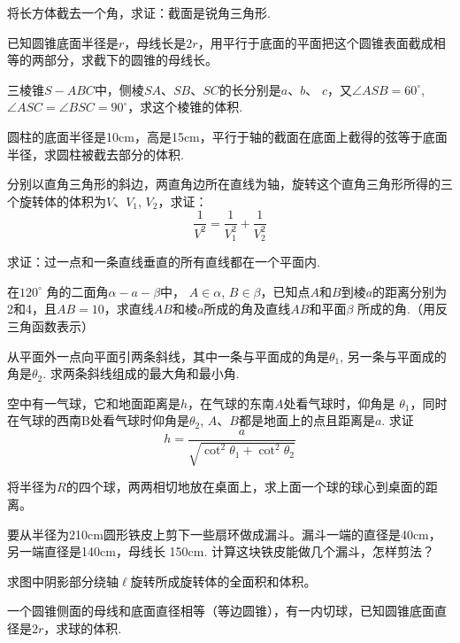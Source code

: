 \begin{enumerate}
 \item 将长方体截去一个角，求证：截面是锐角三角形.
 \item 
已知圆锥底面半径是$r$，母线长是$2r$，用平行于底面的平面把这个圆锥表面截成相等的两部分，求截下的圆锥的母线长。

 \item 三棱锥$S-ABC$中，侧棱$SA$、$SB$、$SC$的长分别是$a$、$b$、 $c$，又$\angle ASB=60^{\circ}$,  $\angle ASC=\angle BSC=90^{\circ}$，求这个棱锥的体积.

 \item 圆柱的底面半径是10cm，高是15cm，平行于轴的截面在底面上截得的弦等于底面半径，求圆柱被截去部分的体积.

 \item 分别以直角三角形的斜边，两直角边所在直线为轴，旋转这个直角三角形所得的三个旋转体的体积为$V$、$V_{1}$, $V_{2}$，求证：
\[
\frac{1}{V^{2}}=\frac{1}{V_{1}^{2}}+\frac{1}{V_{2}^{2}}\]

 \item 求证：过一点和一条直线垂直的所有直线都在一个平面内.

 \item 在$120^{\circ}$ 角的二面角$\alpha-a-\beta$中， $A\in\alpha$,  $B\in\beta$，已知点$A$和$B$到棱$a$的距离分别为2和4，且$AB=10$，求直线$AB$和棱$a$所成的角及直线$AB$和平面$\beta$ 所成的角.（用反三角函数表示）

 \item 从平面外一点向平面引两条斜线，其中一条与平面成的角是$\theta_{1}$, 另一条与平面成的角是$\theta_{2}$. 求两条斜线组成的最大角和最小角.

 \item 空中有一气球，它和地面距离是$h$，在气球的东南$A$处看气球时，仰角是 $\theta_{1}$，同时在气球的西南B处看气球时仰角是$\theta_{2}$,  $A$、$B$都是地面上的点且距离是$a$. 求证
\[h=\frac{a}{\sqrt{\cot^{2}\theta_{1}+\cot^{2}\theta_{2}}}\]
\item 将半径为$R$的四个球，两两相切地放在桌面上，求上面一个球的球心到桌面的距离。

\noindent
\begin{minipage}{.66\textwidth}
\item 
要从半径为210cm圆形铁皮上剪下一些扇环做成漏斗。漏斗一端的直径是40cm，另一端直径是140cm，母线长 150cm. 计算这块铁皮能做几个漏斗，怎样剪法？

\item 求图中阴影部分绕轴$\ell$旋转所成旋转体的全面积和体积。

\item 一个圆锥侧面的母线和底面直径相等（等边圆锥），有一内切球，已知圆锥底面直径是$2r$，求球的体积.
\end{minipage}\hfill 
\begin{minipage}{.3\textwidth}
\centering
\begin{tikzpicture}[>=stealth, scale=0.9]


\end{tikzpicture}
\end{minipage}
\end{enumerate}
